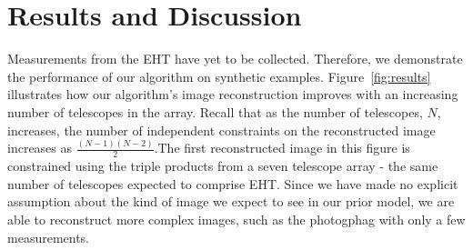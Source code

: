 \section{Results and Discussion}
\label{section:results}

Measurements from the EHT have yet to be collected. Therefore, we demonstrate the performance of our algorithm on synthetic examples. Figure~\ref{fig:results} illustrates how our algorithm's image reconstruction improves with an increasing number of telescopes in the array. Recall that as the number of telescopes, $N$, increases, the number of independent constraints on the reconstructed image increases as $\frac{(N-1)(N-2)}{2}$.The first reconstructed image in this figure is constrained using the triple products from a seven telescope array - the same number of telescopes expected to comprise EHT.  Since we have made no explicit assumption about the kind of image we expect to see in our prior model, we are able to reconstruct more complex images, such as the photogphag with only a few measurements.


